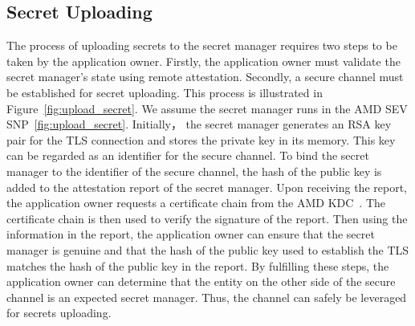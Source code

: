 \subsection{Secret Uploading}
\label{sec:design_Secret_Uploading}
The process of uploading secrets to the secret manager requires two steps to be taken by the application owner. Firstly, the application owner must validate the secret manager's state using remote attestation. Secondly, a secure channel must be established for secret uploading. This process is illustrated in Figure~\ref{fig:upload_secret}. We assume the secret manager runs in the AMD SEV SNP~\ref{fig:upload_secret}. 
Initially， the secret manager generates an RSA key pair for the TLS connection and stores the private key in its memory. This key can be regarded as an identifier for the secure channel. To bind the secret manager to the identifier of the secure channel, the hash of the public key is added to the attestation report of the secret manager. Upon receiving the report, 
the application owner requests a certificate chain from the AMD KDC~\cite*{snp_kdc}. The certificate chain is then used to verify the signature of the report. Then using the information in the report, the application owner can ensure that the secret manager is genuine and that the hash of the public key used to establish the TLS matches the hash of the public key 
in the report. By fulfilling these steps, the application owner can determine that the entity on the other side of the secure channel is an expected secret manager. Thus, the channel can safely be leveraged for secrets uploading.


